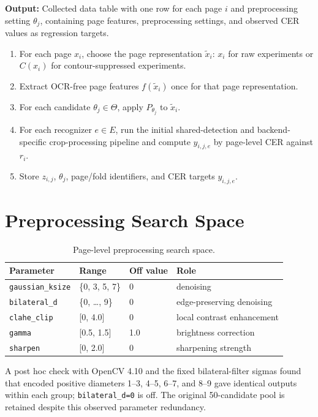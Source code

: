 \documentclass{article}
\begin{document}
\noindent\textbf{Output:} Collected data table with one row for each page \(i\) and preprocessing setting \(\theta_j\), containing page features, preprocessing settings, and observed CER values as regression targets.

\begin{enumerate}
    \item For each page \(x_i\), choose the page representation \(\tilde{x}_i\): \(x_i\) for raw experiments or \(C(x_i)\) for contour-suppressed experiments.
    \item Extract OCR-free page features \(f(\tilde{x}_i)\) once for that page representation.
    \item For each candidate \(\theta_j \in \Theta\), apply \(P_{\theta_j}\) to \(\tilde{x}_i\).
    \item For each recognizer \(e \in E\), run the initial shared-detection and backend-specific crop-processing pipeline and compute \(y_{i,j,e}\) by page-level CER against \(r_i\).
    \item Store \(z_{i,j}\), \(\theta_j\), page/fold identifiers, and CER targets \(y_{i,j,e}\).
\end{enumerate}

\section{Preprocessing Search Space}

\begin{table}[h]
\centering
\caption{Page-level preprocessing search space.}
\begin{tabularx}{\textwidth}{p{3.2cm} p{3.0cm} p{2.2cm} X}
\toprule
Parameter & Range & Off value & Role \\
\midrule
\texttt{gaussian\_ksize} & \{0, 3, 5, 7\} & 0 & denoising \\
\texttt{bilateral\_d} & \{0, \ldots, 9\} & 0 & edge-preserving denoising \\
\texttt{clahe\_clip} & [0, 4.0] & 0 & local contrast enhancement \\
\texttt{gamma} & [0.5, 1.5] & 1.0 & brightness correction \\
\texttt{sharpen} & [0, 2.0] & 0 & sharpening strength \\
\bottomrule
\end{tabularx}
\end{table}

A post hoc check with OpenCV 4.10 and the fixed bilateral-filter sigmas found that encoded positive diameters 1--3, 4--5, 6--7, and 8--9 gave identical outputs within each group; \texttt{bilateral\_d=0} is off. The original 50-candidate pool is retained despite this observed parameter redundancy.
\end{document}
